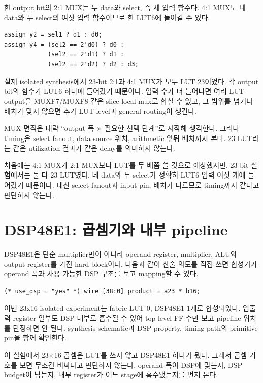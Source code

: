 한 output bit의 2:1 MUX는 두 data와 select, 즉 세 입력 함수다. 4:1 MUX도
네 data와 두 select의 여섯 입력 함수이므로 한 LUT6에 들어갈 수 있다.

\begin{lstlisting}
assign y2 = sel1 ? d1 : d0;
assign y4 = (sel2 == 2'd0) ? d0 :
            (sel2 == 2'd1) ? d1 :
            (sel2 == 2'd2) ? d2 : d3;
\end{lstlisting}

실제 isolated synthesis에서 23-bit 2:1과 4:1 MUX가 모두 LUT 23이었다. 각
output bit의 함수가 LUT6 하나에 들어갔기 때문이다. 입력 수가 더 늘어나면 여러
LUT output을 MUXF7/MUXF8 같은 slice-local mux로 합칠 수 있고, 그 범위를 넘거나
배치가 맞지 않으면 추가 LUT level과 general routing이 생긴다.

MUX 면적은 대략 ``output 폭 $\times$ 필요한 선택 단계''로 시작해 생각한다.
그러나 timing은 select fanout, data source 위치, arithmetic 앞뒤 배치까지 본다.
23 LUT라는 같은 utilization 결과가 같은 delay를 의미하지 않는다.

처음에는 4:1 MUX가 2:1 MUX보다 LUT를 두 배쯤 쓸 것으로 예상했지만, 23-bit
실험에서는 둘 다 23 LUT였다. 네 data와 두 select가 정확히 LUT6 입력 여섯 개에
들어갔기 때문이다. 대신 select fanout과 input pin, 배치가 다르므로 timing까지
같다고 판단하지 않는다.

\section{DSP48E1: 곱셈기와 내부 pipeline}

DSP48E1은 단순 multiplier만이 아니라 operand register, multiplier, ALU와 output
register를 가진 hard block이다. 다음과 같이 산술 의도를 직접 쓰면 합성기가
operand 폭과 사용 가능한 DSP 구조를 보고 mapping할 수 있다.

\begin{lstlisting}
(* use_dsp = "yes" *) wire [38:0] product = a23 * b16;
\end{lstlisting}

이번 23x16 isolated experiment는 fabric LUT 0, DSP48E1 1개로 합성되었다.
입출력 register 일부도 DSP 내부로 흡수될 수 있어 top-level FF 수만 보고 pipeline
위치를 단정하면 안 된다. synthesis schematic과 DSP property, timing path의
primitive pin을 함께 확인한다.

이 실험에서 23$\times$16 곱셈은 LUT를 쓰지 않고 DSP48E1 하나가 됐다. 그래서
곱셈 기호를 보면 무조건 비싸다고 판단하지 않는다. operand 폭이 DSP에 맞는지,
DSP budget이 남는지, 내부 register가 어느 stage에 흡수됐는지를 먼저 본다.

